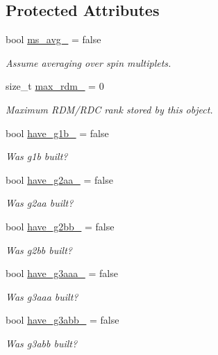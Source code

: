 \subsection*{Protected Attributes}
\begin{DoxyCompactItemize}
\item 
bool \mbox{\hyperlink{classforte_1_1_r_d_ms_aa6650c663cfbcc1157f7e876b5e66ebc}{ms\+\_\+avg\+\_\+}} = false
\begin{DoxyCompactList}\small\item\em Assume averaging over spin multiplets. \end{DoxyCompactList}\item 
size\+\_\+t \mbox{\hyperlink{classforte_1_1_r_d_ms_a2a37bb48ba02e8182366fac7c8099728}{max\+\_\+rdm\+\_\+}} = 0
\begin{DoxyCompactList}\small\item\em Maximum R\+D\+M/\+R\+DC rank stored by this object. \end{DoxyCompactList}\item 
bool \mbox{\hyperlink{classforte_1_1_r_d_ms_a07cecc79cd6ff176d1342833a6d1c797}{have\+\_\+g1b\+\_\+}} = false
\begin{DoxyCompactList}\small\item\em Was g1b built? \end{DoxyCompactList}\item 
bool \mbox{\hyperlink{classforte_1_1_r_d_ms_a42629ce6248245e324483382278e9d2e}{have\+\_\+g2aa\+\_\+}} = false
\begin{DoxyCompactList}\small\item\em Was g2aa built? \end{DoxyCompactList}\item 
bool \mbox{\hyperlink{classforte_1_1_r_d_ms_af24ccd66ee96aa2bc3def90afa54468b}{have\+\_\+g2bb\+\_\+}} = false
\begin{DoxyCompactList}\small\item\em Was g2bb built? \end{DoxyCompactList}\item 
bool \mbox{\hyperlink{classforte_1_1_r_d_ms_aac4cc838eeb5ebbeeb78d2300236d40a}{have\+\_\+g3aaa\+\_\+}} = false
\begin{DoxyCompactList}\small\item\em Was g3aaa built? \end{DoxyCompactList}\item 
bool \mbox{\hyperlink{classforte_1_1_r_d_ms_aa34358400fadd5de98623db299d39f6b}{have\+\_\+g3abb\+\_\+}} = false
\begin{DoxyCompactList}\small\item\em Was g3abb built? \end{DoxyCompactList}\item 

\end{DoxyCompactItemize}
